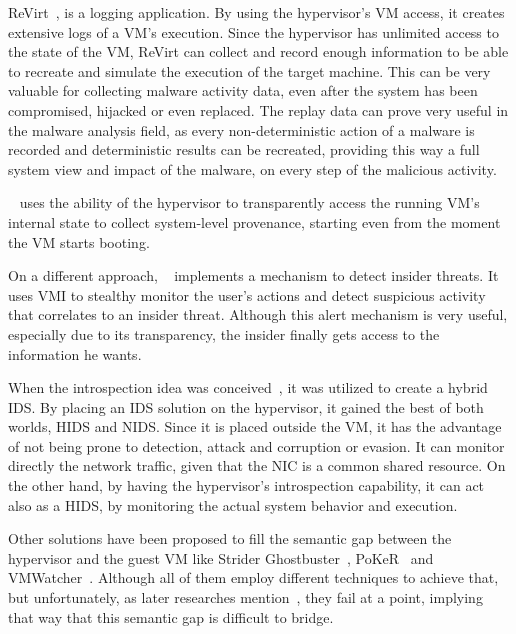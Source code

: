 \par ReVirt~\cite{dunlap2002revirt}, is a logging application. By using the hypervisor’s \ac{VM} access, it creates extensive logs of a \ac{VM}’s execution. Since the hypervisor has unlimited access to the state of the \ac{VM}, ReVirt can collect and record enough information to be able to recreate and simulate the execution of the target machine. This can be very valuable for collecting malware activity data, even after the system has been compromised, hijacked or even replaced. The replay data can prove very useful in the malware analysis field, as every non-deterministic action of a malware is recorded and deterministic results can be recreated, providing this way a full system view and impact of the malware, on every step of the malicious activity.

\par ~\cite{macko2011collecting} uses the ability of the hypervisor to transparently access the running \ac{VM}’s internal state to collect system-level provenance, starting even from the moment the \ac{VM} starts booting. 

\par On a different approach, ~\cite{crawford2013insider} implements a mechanism to detect insider threats. It uses \ac{VMI} to stealthy monitor the user’s actions and detect suspicious activity that correlates to an insider threat. Although this alert mechanism is very useful, especially due to its transparency, the insider finally gets access to the information he wants.

\par When the introspection idea was conceived~\cite{garfinkel2003virtual}, it was utilized to create a hybrid \ac{IDS}. By placing an \ac{IDS} solution on the hypervisor, it gained the best of both worlds, \ac{HIDS} and \ac{NIDS}. Since it is placed outside the \ac{VM}, it has the advantage of not being prone to detection, attack and corruption or evasion. It can monitor directly the network traffic, given that the \ac{NIC} is a common shared resource. On the other hand, by having the hypervisor’s introspection capability, it can act also as a \ac{HIDS}, by monitoring the actual system behavior and execution. 

\par Other solutions have been proposed to fill the semantic gap between the hypervisor and the guest \ac{VM} like Strider Ghostbuster~\cite{wang2005detecting}, PoKeR~\cite{riley2009multi} and VMWatcher~\cite{jiang2007stealthy}. Although all of them employ different techniques to achieve that, but unfortunately, as later researches mention~\cite{mahapatra2011online}, they fail at a point, implying that way that this semantic gap is difficult to bridge. 


